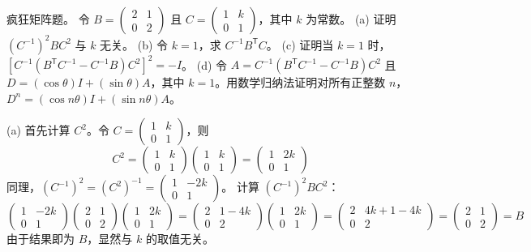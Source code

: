 \begin{questions}
    \question 疯狂矩阵题。
令 $B = \begin{pmatrix} 2 & 1 \\ 0 & 2 \end{pmatrix}$ 且 $C = \begin{pmatrix} 1 & k \\ 0 & 1 \end{pmatrix}$，其中 $k$ 为常数。
(a) 证明 $(C^{-1})^2 B C^2$ 与 $k$ 无关。
(b) 令 $k=1$，求 $C^{-1} B^{\mathsf{T}} C$。
(c) 证明当 $k=1$ 时，$\left[ C^{-1}(B^{\mathsf{T}} C^{-1} - C^{-1} B) C^2 \right]^2 = -I$。
(d) 令 $A = C^{-1}(B^{\mathsf{T}} C^{-1} - C^{-1} B) C^2$ 且 $D = (\cos \theta) I + (\sin \theta) A$，其中 $k=1$。用数学归纳法证明对所有正整数 $n$，$D^n = (\cos n\theta) I + (\sin n\theta) A$。
\begin{solution}
(a) 首先计算 $C^2$。令 $C = \begin{pmatrix} 1 & k \\ 0 & 1 \end{pmatrix}$，则
\[
C^2 = \begin{pmatrix} 1 & k \\ 0 & 1 \end{pmatrix} \begin{pmatrix} 1 & k \\ 0 & 1 \end{pmatrix} = \begin{pmatrix} 1 & 2k \\ 0 & 1 \end{pmatrix}
\]
同理，$(C^{-1})^2 = (C^2)^{-1} = \begin{pmatrix} 1 & -2k \\ 0 & 1 \end{pmatrix}$。
计算 $(C^{-1})^2 B C^2$：
\[
\begin{pmatrix} 1 & -2k \\ 0 & 1 \end{pmatrix} \begin{pmatrix} 2 & 1 \\ 0 & 2 \end{pmatrix} \begin{pmatrix} 1 & 2k \\ 0 & 1 \end{pmatrix} = \begin{pmatrix} 2 & 1-4k \\ 0 & 2 \end{pmatrix} \begin{pmatrix} 1 & 2k \\ 0 & 1 \end{pmatrix} = \begin{pmatrix} 2 & 4k + 1 - 4k \\ 0 & 2 \end{pmatrix} = \begin{pmatrix} 2 & 1 \\ 0 & 2 \end{pmatrix} = B
\]
由于结果即为 $B$，显然与 $k$ 的取值无关。


\end{solution}
\end{questions}
